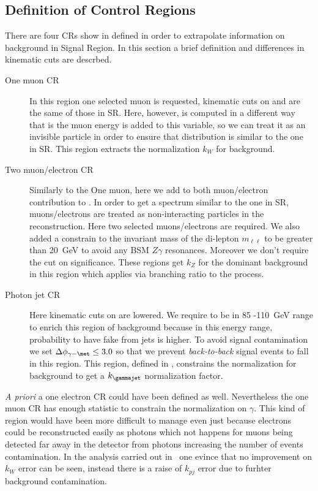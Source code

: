 \subsection{Definition of Control Regions}

There are four CRs show in \Fig{\ref{fig:regions}} defined in order to extrapolate information on background in Signal Region. In this section a brief definition and differences in kinematic cuts are descrbed.

\begin{description}
\item [One muon CR] In this region one selected muon is requested, kinematic cuts on \pt and \met are the same of those in SR. Here, however, \met is computed in a different way that is the muon energy is added to this variable, so we can treat it as an invisible particle in order to ensure that \met distribution is similar to the one in SR. This region extracts the normalization $k_W$ for \wg background.
\item [Two muon/electron CR] Similarly to the One muon, here we add to \met both muon/electron contribution to \met. In order to get a \met spectrum similar to the one in SR, muons/electrons are treated as non-interacting particles in the \met reconstruction. Here two selected muons/electrons are required. We also added a constrain to the invariant mass of the di-lepton $m_{\ell\ell}$ to be greater than \SI{20}{\GeV} to avoid any BSM $Z\gamma$ resonances. Moreover we don't require the cut on \met significance. These regions get $k_Z$ for the dominant background \zg in this region which applies via branching ratio to the \znng process.
\item [Photon jet CR] Here kinematic cuts on \met are lowered. We require \met to be in \SI{85}{\gev} -\SI{110}{\GeV} range to enrich this region of \gj background because in this energy range, probability to have fake \met from jets is higher. To avoid signal contamination we set $\Delta\phi_{\gamma - \met} \le 3.0$ so that we prevent {\itshape back-to-back} signal events to fall in this region. This region, defined in \RunTwo, constrains the normalization for \gj background to get a $k_{\gammajet}$ normalization factor.
\end{description}

{\itshape A priori} a one electron CR could have been defined as well. Nevertheless the one muon CR has enough statistic to constrain the normalization on \Wboson$\gamma$.  This kind of region would have been more difficult to manage even just because electrons could be reconstructed easily as photons which not happens for muons being detected far away in the detector from photons increasing the number of \gj events contamination. In the analysis carried out in~\cite{paperMP} one evince that no improvement on $k_W$ error can be seen, instead there is a raise of $k_{pj}$ error due to furhter background contamination.

